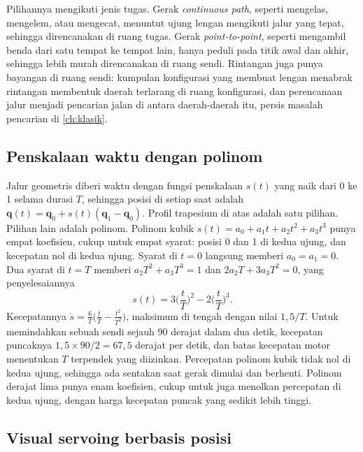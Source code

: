 Pilihannya mengikuti jenis tugas. Gerak \emph{continuous path}, seperti mengelas, mengelem, atau mengecat, menuntut ujung lengan
mengikuti jalur yang tepat, sehingga direncanakan di ruang tugas. Gerak \emph{point-to-point}, seperti mengambil benda dari satu tempat
ke tempat lain, hanya peduli pada titik awal dan akhir, sehingga lebih murah direncanakan di ruang sendi. Rintangan juga punya
bayangan di ruang sendi: kumpulan konfigurasi yang membuat lengan menabrak rintangan membentuk daerah terlarang di ruang
konfigurasi, dan perencanaan jalur menjadi pencarian jalan di antara daerah-daerah itu, persis masalah pencarian di \cref{ch:klasik}.

\subsection{Penskalaan waktu dengan polinom}

Jalur geometris diberi waktu dengan fungsi penskalaan $s(t)$ yang naik dari 0 ke 1 selama durasi $T$, sehingga posisi di setiap
saat adalah $\bm q(t)=\bm q_0+s(t)(\bm q_1-\bm q_0)$. Profil trapesium di atas adalah satu pilihan. Pilihan lain adalah polinom. Polinom
kubik $s(t)=a_0+a_1t+a_2t^2+a_3t^3$ punya empat koefisien, cukup untuk empat syarat: posisi 0 dan 1 di kedua ujung, dan kecepatan nol
di kedua ujung. Syarat di $t=0$ langsung memberi $a_0=a_1=0$. Dua syarat di $t=T$ memberi $a_2T^2+a_3T^3=1$ dan $2a_2T+3a_3T^2=0$, yang
penyelesaiannya
\begin{equation}
s(t)=3\Big(\frac tT\Big)^2-2\Big(\frac tT\Big)^3 .
\end{equation}
Kecepatannya $\dot s=\tfrac6T\big(\tfrac tT-\tfrac{t^2}{T^2}\big)$, maksimum di tengah dengan nilai $1{,}5/T$. Untuk memindahkan sebuah sendi
sejauh 90 derajat dalam dua detik, kecepatan puncaknya $1{,}5\times90/2=67{,}5$ derajat per detik, dan batas kecepatan motor menentukan
$T$ terpendek yang diizinkan. Percepatan polinom kubik tidak nol di kedua ujung, sehingga ada sentakan saat gerak dimulai dan berhenti.
Polinom derajat lima punya enam koefisien, cukup untuk juga menolkan percepatan di kedua ujung, dengan harga kecepatan puncak yang
sedikit lebih tinggi.

\subsection{Visual servoing berbasis posisi}

